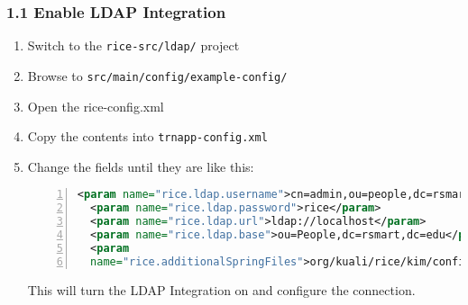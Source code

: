 \subsubsection*{1.1 Enable LDAP Integration}
\begin{enumerate}
\item Switch to the \verb|rice-src/ldap/| project
\item Browse to \verb|src/main/config/example-config/|
\item Open the rice-config.xml
\item Copy the contents into \verb|trnapp-config.xml|
\item Change the fields until they are like this:
\begin{lstlisting}[numbers=left,language=xml,basicstyle=\scriptsize,backgroundcolor=\color{ubergray},caption={trnapp-config.xml},frame=single,breaklines=true]
  <param name="rice.ldap.username">cn=admin,ou=people,dc=rsmart,dc=com</param>
  <param name="rice.ldap.password">rice</param>
  <param name="rice.ldap.url">ldap://localhost</param>
  <param name="rice.ldap.base">ou=People,dc=rsmart,dc=edu</param>
  <param
  name="rice.additionalSpringFiles">org/kuali/rice/kim/config/KIMLdapSpringBeans.xml</param>
\end{lstlisting}
This will turn the LDAP Integration on and configure the connection.
\end{enumerate}

